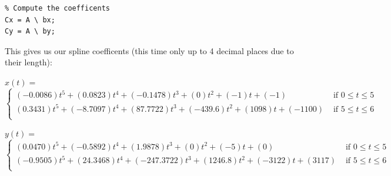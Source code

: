 \documentclass[english]{article}
\begin{document}
\begin{enumerate}
\begin{lstlisting}
% Compute the coefficents
Cx = A \ bx;
Cy = A \ by;

\end{lstlisting}

This gives us our spline coefficents (this time only up to 4 decimal places due to their length):

\(x(t) = \)
\[
\begin{cases}
(-0.0086)t^5 + (0.0823)t^4 + (-0.1478)t^3 + (0)t^2 + (-1)t + (-1) & \textrm{ if } 0 \leq t \leq 5 \\
(0.3431)t^5 + (-8.7097)t^4 + (87.7722)t^3 + (-439.6)t^2 + (1098)t + (-1100) & \textrm{ if } 5 \leq t \leq 6 \\
\end{cases}
\]

\(y(t) = \)
\[
\begin{cases}
(0.0470)t^5 + (-0.5892)t^4 + (1.9878)t^3 + (0)t^2 + (-5)t + (0) & \textrm{ if } 0 \leq t \leq 5 \\
(-0.9505)t^5 + (24.3468)t^4 + (-247.3722)t^3 + (1246.8)t^2 + (-3122)t + (3117) & \textrm{ if } 5 \leq t \leq 6 \\
\end{cases}
\]



\end{enumerate}
\end{document}
